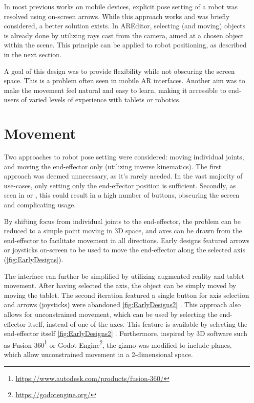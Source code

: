 In most previous works on mobile devices, explicit pose setting of a robot was resolved using on-screen arrows. While this approach works and was briefly considered, a better solution exists. In AREditor, selecting (and moving) objects is already done by utilizing rays cast from the camera, aimed at a chosen object within the scene. This principle can be applied to robot positioning, as described in the next section.

A goal of this design was to provide flexibility while not obscuring the screen space. This is a problem often seen in mobile AR interfaces. Another aim was to make the movement feel natural and easy to learn, making it accessible to end-users of varied levels of experience with tablets or robotics.

\section{Movement}
Two approaches to robot pose setting were considered: moving individual joints, and moving the end-effector only (utilizing inverse kinematics). The first approach was deemed unnecessary, as it's rarely needed. In the vast majority of use-cases, only setting only the end-effector position is sufficient. Secondly, as seen in \cite{Zhang2020AugmentedRI} or \cite{Tango}, this could result in a high number of buttons, obscuring the screen and complicating usage.

By shifting focus from individual joints to the end-effector, the problem can be reduced to a simple point moving in 3D space, and axes can be drawn from the end-effector to facilitate movement in all directions. Early designs featured arrows or joysticks on-screen to be used to move the end-effector along the selected axis (\ref{fig:EarlyDesigns}).



The interface can further be simplified by utilizing augmented reality and tablet movement. After having selected the axis, the object can be simply moved by moving the tablet. The second iteration featured a single button for axis selection and arrows (joysticks) were abandoned \ref{fig:EarlyDesigns2} . This approach also allows for unconstrained movement, which can be used by selecting the end-effector itself, instead of one of the axes. This feature is available by selecting the end-effector itself \ref{fig:EarlyDesigns2} . Furthermore, inspired by 3D software such as Fusion 360\footnote{\href{https://www.autodesk.com/products/fusion-360/}{https://www.autodesk.com/products/fusion-360/}} or Godot Engine\footnote{\href{https://godotengine.org/}{https://godotengine.org/}}, the gizmo was modified to include planes, which allow unconstrained movement in a 2-dimensional space. 

